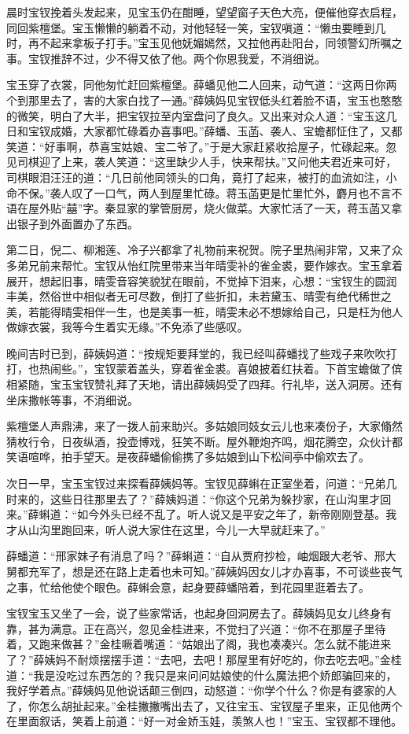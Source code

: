 \documentclass[12pt,oneside]{book}
\begin{document}
晨时宝钗挽着头发起来，见宝玉仍在酣睡，望望窗子天色大亮，便催他穿衣启程，同回紫檀堡。宝玉懒懒的躺着不动，对他轻轻一笑，宝钗嗔道：“懒虫要睡到几时，再不起来拿板子打手。”宝玉见他妩媚嫣然，又拉他再赴阳台，同领警幻所嘱之事。宝钗推辞不过，少不得又依了他。两个你恩我爱，不消细说。

宝玉穿了衣裳，同他匆忙赶回紫檀堡。薛蟠见他二人回来，动气道：“这两日你两个到那里去了，害的大家白找了一通。”薛姨妈见宝钗低头红着脸不语，宝玉也憨憨的微笑，明白了大半，把宝钗拉至内室盘问了良久。又出来对众人道：“宝玉这几日和宝钗成婚，大家都忙碌着办喜事吧。”薛蟠、玉菡、袭人、宝蟾都怔住了，又都笑道：“好事啊，恭喜宝姑娘、宝二爷了。”于是大家赶紧收拾屋子，忙碌起来。忽见司棋迎了上来，袭人笑道：“这里缺少人手，快来帮扶。”又问他夫君近来可好，司棋眼泪汪汪的道：“几日前他同领头的口角，竟打了起来，被打的血流如注，小命不保。”袭人叹了一口气，两人到屋里忙碌。蒋玉菡更是忙里忙外，麝月也不言不语在屋外贴“囍”字。秦显家的掌管厨房，烧火做菜。大家忙活了一天，蒋玉菡又拿出银子到外面置办了东西。

第二日，倪二、柳湘莲、冷子兴都拿了礼物前来祝贺。院子里热闹非常，又来了众多弟兄前来帮忙。宝钗从怡红院里带来当年晴雯补的雀金裘，要作嫁衣。宝玉拿着展开，想起旧事，晴雯音容笑貌犹在眼前，不觉掉下泪来，心想：“宝钗生的圆润丰美，然俗世中相似者无可尽数，倒打了些折扣，未若黛玉、晴雯有绝代稀世之美，若能得晴雯相伴一生，也是美事一桩，晴雯未必不想嫁给自己，只是枉为他人做嫁衣裳，我等今生着实无缘。”不免添了些感叹。

晚间吉时已到，薛姨妈道：“按规矩要拜堂的，我已经叫薛蟠找了些戏子来吹吹打打，也热闹些。”，宝钗蒙着盖头，穿着雀金裘。喜娘披着红扶着。下首宝蟾做了傧相紧随，宝玉宝钗赞礼拜了天地，请出薛姨妈受了四拜。行礼毕，送入洞房。还有坐床撒帐等事，不消细说。

紫檀堡人声鼎沸，来了一拨人前来助兴。多姑娘同妓女云儿也来凑份子，大家翛然猜枚行令，日夜纵酒，投壶博戏，狂笑不断。屋外鞭炮齐鸣，烟花腾空，众伙计都笑语喧哗，拍手望天。是夜薛蟠偷偷携了多姑娘到山下松间亭中偷欢去了。

次日一早，宝玉宝钗过来探看薛姨妈等。宝钗见薛蝌在正室坐着，问道：“兄弟几时来的，这些日往那里去了？”薛姨妈道：“你这个兄弟为躲抄家，在山沟里才回来。”薛蝌道：“如今外头已经不乱了。听人说又是平安之年了，新帝刚刚登基。我才从山沟里跑回来，听人说大家住在这里，今儿一大早就赶来了。”

薛蟠道：“邢家妹子有消息了吗？”薛蝌道：“自从贾府抄检，岫烟跟大老爷、邢大舅都充军了，想是还在路上走着也未可知。”薛姨妈因女儿才办喜事，不可谈些丧气之事，忙给他使个眼色。薛蝌会意，起身要薛蟠陪着，到花园里逛着去了。

宝钗宝玉又坐了一会，说了些家常话，也起身回洞房去了。薛姨妈见女儿终身有靠，甚为满意。正在高兴，忽见金桂进来，不觉扫了兴道：“你不在那屋子里待着，又跑来做甚？”金桂噘着嘴道：“姑娘出了阁，我也凑凑兴。怎么就不能进来了？”薛姨妈不耐烦摆摆手道：“去吧，去吧！那屋里有好吃的，你去吃去吧。”金桂道：“我是没吃过东西怎的？我只是来问问姑娘使的什么魔法把个娇郎骗回来的，我好学着点。”薛姨妈见他说话颠三倒四，动怒道：“你学个什么？你是有婆家的人了，你怎么胡扯起来。”金桂撇撇嘴出去了，又往宝玉、宝钗屋子里来，正见他两个在里面叙话，笑着上前道：“好一对金娇玉娃，羡煞人也！”宝玉、宝钗都不理他。
\end{document}
